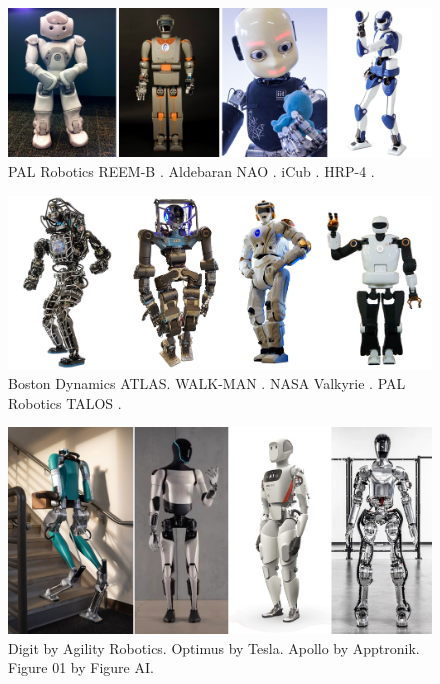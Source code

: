 \begin{figure}
    \centering
    \includegraphics[width=\textwidth]{figures/01-introduction/robots-in-2000.jpg}
    \caption{PAL Robotics REEM-B \cite{Tellez2008REEMB}.
        Aldebaran NAO \cite{Gouaillier2008NAOHumanoid}.
        iCub \cite{Metta2010iCubHumanoid}.
        HRP-4 \cite{Kaneko2011HRP4}.
    }
    \label{fig:introduction:robots-in-2000}
\end{figure}

\begin{figure}
    \centering
    \includegraphics[width=\textwidth]{figures/01-introduction/robots-in-2010.jpg}
    \caption{Boston Dynamics ATLAS. WALK-MAN \cite{Tsagarakis2017WALKMAN}.
        NASA Valkyrie \cite{Radford2015Valkyrie}.
        PAL Robotics TALOS \cite{Stasse2017TALOS}.}
    \label{fig:introduction:robots-in-2010}
\end{figure}

\begin{figure}
    \centering
    \includegraphics[width=\textwidth]{figures/01-introduction/robots-in-2020.jpg}
    \caption{Digit by Agility Robotics. Optimus by Tesla. Apollo by Apptronik.
        Figure 01 by Figure AI.
    }
    \label{fig:introduction:robots-in-2020}
\end{figure}

